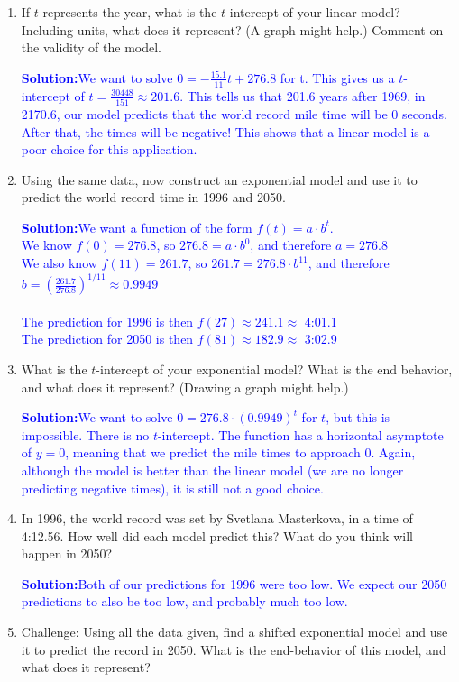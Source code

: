 \documentclass[letterpaper,11pt]{article}
\newcommand{\sol}[2]{\begin{minipage}[c][#1]{\linewidth}{\textcolor{blue}{\textbf{Solution:}}\quad \textcolor{blue}{#2}}\end{minipage}}
\newcommand{\sol}[2]{\begin{minipage}[c][#1]{\linewidth}{\vfill}\end{minipage}}
\begin{document}
\begin{enumerate}
\begin{enumerate}
\item  If $t$ represents the year, what is the $t$-intercept of your linear model?  Including units, what does it represent?  (A graph might help.)  Comment on the validity of the model.

\sol{.8 in}{We want to solve $0=-\frac{15.1}{11} t+276.8$ for t. This gives us a $t$-intercept of $t=\frac{30448}{151}\approx201.6$. This tells us that 201.6 years after 1969, in 2170.6, our model predicts that the world record mile time will be 0 seconds.  After that, the times will be negative!  This shows that a linear model is a poor choice for this application.}

\item Using the same data, now construct an exponential model and use it to predict the world record time in 1996 and 2050.

\sol{1.3 in}{We want a function of the form $f(t)=a\cdot b^t$.\\
We know $f(0)=276.8$, so $276.8=a \cdot b^0$, and therefore $a=276.8$\\
We also know $f(11)=261.7$, so $261.7=276.8 \cdot b^{11}$, and therefore $b=(\frac{261.7}{276.8})^{1/11}\approx0.9949$ \\ \\
The prediction for 1996 is then $f(27)\approx 241.1\approx$ 4:01.1 \\
The prediction for 2050 is then $f(81)\approx 182.9\approx$ 3:02.9}

\item What is the $t$-intercept of your exponential model?  What is the end behavior, and what does it represent?  (Drawing a graph might help.)

\sol{.8 in}{We want to solve $0=276.8\cdot(0.9949)^t$ for $t$, but this is impossible. There is no $t$-intercept.  The function has a horizontal asymptote of $y = 0$, meaning that we predict the mile times to approach 0.  Again, although the model is better than the linear model (we are no longer predicting negative times), it is still not a good choice.} 

\item  In 1996, the world record  was set by Svetlana Masterkova, in a time of 4:12.56.  How well did each model predict this?  What do you think will happen in 2050?

\sol{.35 in}{Both of our predictions for 1996 were too low. We expect our 2050 predictions to also be too low, and probably much too low.}

\item  Challenge:  Using all the data given, find a shifted exponential model and use it to predict the  record in 2050.  What is the end-behavior of this model, and what does it represent?
\end{enumerate}


\end{enumerate}
\end{document}
